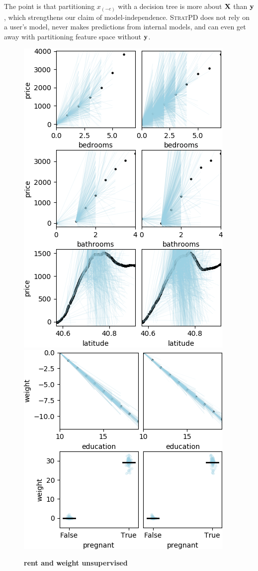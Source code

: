 \documentclass[12pt]{article}
\newcommand{\spd}{\fontfamily{cmr}\textsc{\small StratPD}}
\newcommand{\xnc}{$x_{(-c)}$}
\begin{document}
The point is that partitioning \xnc{}  with a decision tree is more about $\bf X$ than $\bf y$, which strengthens our claim of model-independence. \spd{} does not rely on a user's model, never makes predictions from internal models, and can even get away with partitioning feature space without $\bf y$.

\begin{figure}[htbp]
\begin{center}
\includegraphics[scale=0.7]{images/rent_unsup.png}
\includegraphics[scale=0.7]{images/weight_unsup.png}
\caption{{\bf  rent and weight unsupervised}}
\label{fig:rent_weight_unsup}
\end{center}
\end{figure}
\end{document}
